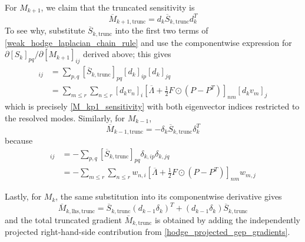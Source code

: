 \documentclass[11pt, a4paper]{article}
\begin{document}
For $M_{k+1}$, we claim that the truncated sensitivity is
\begin{equation}
\boxed{
    \overline M_{k+1,\text{trunc}} = d_k\overline S_{k,\text{trunc}}d_k^T
}
\end{equation}
To see why, substitute $\overline S_{k,\text{trunc}}$ into the first two terms of \eqref{weak_hodge_laplacian_chain_rule} and use the componentwise expression for $\partial[S_k]_{pq}/\partial[M_{k+1}]_{ij}$ derived above; this gives
\begin{align}
    [\overline M_{k+1,\text{trunc}}]_{ij}
    &= \sum_{p,q}[\overline S_{k,\text{trunc}}]_{pq}[d_k]_{ip}[d_k]_{jq} \\
    &= \sum_{m\le r}\sum_{n\le r}[d_kv_n]_i\left[\overline\Lambda+\frac 1 2 F\odot(P-P^T)\right]_{nm}[d_kv_m]_j
\end{align}
which is precisely \eqref{M_kp1_sensitivity} with both eigenvector indices restricted to the resolved modes. Similarly, for $M_{k-1}$,
\begin{equation}
\boxed{
    \overline M_{k-1,\text{trunc}} = -\delta_k\overline S_{k,\text{trunc}}\delta_k^T
}
\label{hodge_projected_mass_gradients}
\end{equation}
because 
\begin{align}
    [\overline M_{k-1,\text{trunc}}]_{ij}
    &= -\sum_{p,q}[\overline S_{k,\text{trunc}}]_{pq}\delta_{k,ip}\delta_{k,jq} \\
    &= -\sum_{m\le r}\sum_{n\le r} w_{n,i}\left[\overline\Lambda+\frac 1 2 F\odot(P-P^T)\right]_{nm}w_{m,j}
\end{align}

Lastly, for $M_k$, the same substitution into its componentwise derivative gives
\begin{equation}
\boxed{
    \overline M_{k,\text{lhs},\text{trunc}}
    = \overline S_{k,\text{trunc}}(d_{k-1}\delta_k)^T
       +(d_{k-1}\delta_k)\overline S_{k,\text{trunc}}
}
\end{equation}
and the total truncated gradient $\overline M_{k,\text{trunc}}$ is obtained by adding the independently projected right-hand-side contribution from \eqref{hodge_projected_gep_gradients}.

\end{document}

